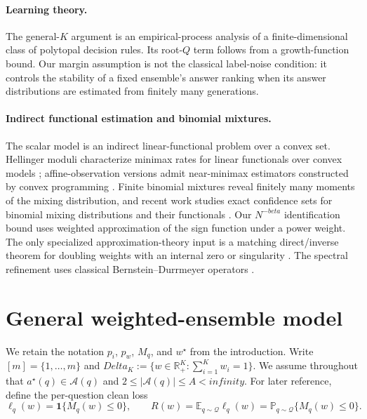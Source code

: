 \documentclass[11pt]{article}
\def\beta{beta}%
\def\infty{infinity}%
\def\Delta{Delta}%
\newcommand{\Pp}{\mathbb P}
\newcommand{\E}{\mathbb E}
\newcommand{\R}{\mathbb R}
\newcommand{\one}{\mathbf 1}
\newcommand{\calQ}{\mathcal Q}
\newcommand{\calA}{\mathcal A}
\begin{document}
\paragraph{Learning theory.}
The general-$K$ argument is an empirical-process analysis of a finite-dimensional class of polytopal decision rules.  Its root-$Q$ term follows from a growth-function bound.  Our margin assumption is not the classical label-noise condition: it controls the stability of a fixed ensemble's answer ranking when its answer distributions are estimated from finitely many generations.

\paragraph{Indirect functional estimation and binomial mixtures.}
The scalar model is an indirect linear-functional problem over a convex set.  Hellinger moduli characterize minimax rates for linear functionals over convex models \citep{DonohoLiuII}; affine-observation versions admit near-minimax estimators constructed by convex programming \citep{JuditskyNemirovski}.  Finite binomial mixtures reveal finitely many moments of the mixing distribution, and recent work studies exact confidence sets for binomial mixing distributions and their functionals \citep{BasuBinomial}.  Our $N^{-\beta}$ identification bound uses weighted approximation of the sign function under a power weight.  The only specialized approximation-theory input is a matching direct/inverse theorem for doubling weights with an internal zero or singularity \citep{Kopotun}.  The spectral refinement uses classical Bernstein--Durrmeyer operators \citep{DurrmeyerSpectral}.

\section{General weighted-ensemble model}
\label{sec:general-model}

We retain the notation $p_i$, $p_w$, $M_q$, and $w^\star$ from the introduction.  Write $[m]=\{1,\dots,m\}$ and $\Delta_K:=\{w\in\R_+^K:\sum_{i=1}^K w_i=1\}$.  We assume throughout that $a^\star(q)\in\calA(q)$ and $2\le |\calA(q)|\le A<\infty$.  For later reference, define the per-question clean loss
\begin{equation}
\label{eq:clean-loss-risk}
\ell_q(w)=\one\{M_q(w)\le0\},
\qquad
R(w)=\E_{q\sim\calQ}\ell_q(w)
=\Pp_{q\sim\calQ}\{M_q(w)\le0\}.
\end{equation}
\end{document}
